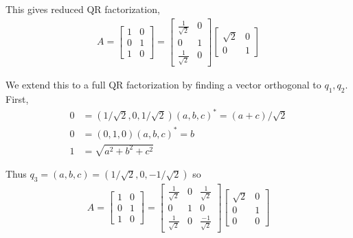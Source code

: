 \documentclass[10pt]{article}
\begin{document}
\begin{solution}[Solution]
\begin{enumerate}
        This gives reduced QR factorization,
        \begin{align*}
            A = \left[\begin{array}{cc}1 & 0\\0 & 1\\1 & 0\end{array}\right] = \left[\begin{array}{cc}\frac{1}{\sqrt{2}} & 0\\ 0 & 1 \\ \frac{1}{\sqrt{2}} & 0\end{array}\right]\left[\begin{array}{cc}\sqrt{2} & 0 \\ 0 & 1\end{array}\right]
        \end{align*}
        
        We extend this to a full QR factorization by finding a vector orthogonal to \( q_1,q_2 \). First,
        \begin{align*}
            0 &= (1/\sqrt{2},0,1/\sqrt{2})(a,b,c)^* = (a+c)/\sqrt{2} \\
            0 &= (0,1,0)(a,b,c)^* = b \\
            1 &=\sqrt{a^2+b^2+c^2}
        \end{align*}

        Thus \( q_3=(a,b,c) = (1/\sqrt{2},0,-1/\sqrt{2}) \) so
        \begin{align*}
            A = \left[\begin{array}{cc}1 & 0\\0 & 1\\1 & 0\end{array}\right] = \left[\begin{array}{ccc}\frac{1}{\sqrt{2}} & 0 & \frac{1}{\sqrt{2}} \\ 0 & 1 & 0 \\ \frac{1}{\sqrt{2}} & 0 & \frac{-1}{\sqrt{2}} \end{array}\right]\left[\begin{array}{cc}\sqrt{2} & 0 \\ 0 & 1 \\ 0 & 0\end{array}\right]
        \end{align*}


\end{enumerate}
\end{solution}
\end{document}
